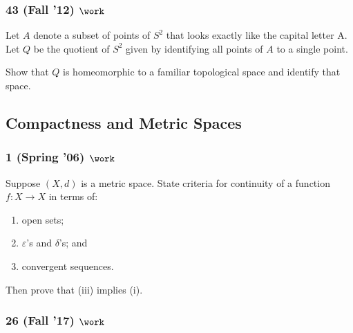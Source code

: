 \hypertarget{fall-12-work}{%
\subsubsection{\texorpdfstring{43 (Fall '12)
\(\work\)}{43 (Fall '12) \textbackslash work}}\label{fall-12-work}}

\begin{problem}[?]

Let \(A\) denote a subset of points of \(S^2\) that looks exactly like
the capital letter A. Let \(Q\) be the quotient of \(S^2\) given by
identifying all points of \(A\) to a single point.

Show that \(Q\) is homeomorphic to a familiar topological space and
identify that space.

\end{problem}

\hypertarget{compactness-and-metric-spaces}{%
\subsection{Compactness and Metric
Spaces}\label{compactness-and-metric-spaces}}

\hypertarget{spring-06-work}{%
\subsubsection{\texorpdfstring{1 (Spring '06)
\(\work\)}{1 (Spring '06) \textbackslash work}}\label{spring-06-work}}

\begin{problem}[?]

Suppose \((X, d)\) is a metric space. State criteria for continuity of a
function \(f : X \to X\) in terms of:

\begin{enumerate}
\def\labelenumi{\roman{enumi}.}
\item
  open sets;
\item
  \(\varepsilon\)'s and \(\delta\)'s; and
\item
  convergent sequences.
\end{enumerate}

Then prove that (iii) implies (i).

\end{problem}

\hypertarget{fall-17-work}{%
\subsubsection{\texorpdfstring{26 (Fall '17)
\(\work\)}{26 (Fall '17) \textbackslash work}}\label{fall-17-work}}

